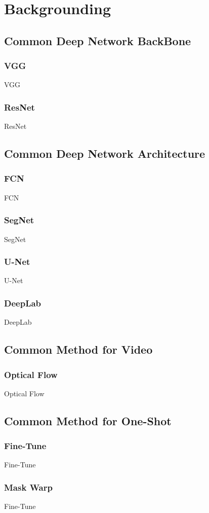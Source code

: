 \section{Backgrounding}


\subsection{Common Deep Network BackBone}
\subsubsection{VGG}
VGG
\subsubsection{ResNet}
ResNet


\subsection{Common Deep Network Architecture}

\subsubsection{FCN}
FCN


\subsubsection{SegNet}
SegNet

\subsubsection{U-Net}
U-Net


\subsubsection{DeepLab}
DeepLab

\subsection{Common Method for Video}

\subsubsection{Optical Flow}
Optical Flow

\subsection{Common Method for One-Shot}

\subsubsection{Fine-Tune}
Fine-Tune

\subsubsection{Mask Warp}
Fine-Tune